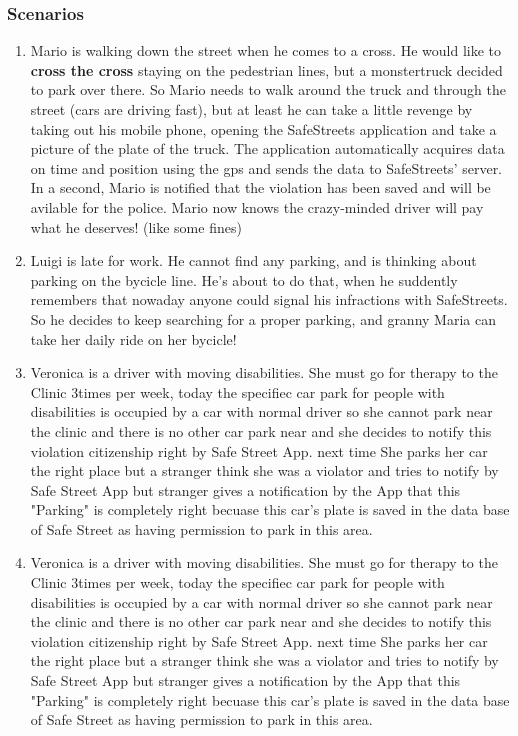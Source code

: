 \documentclass{article}
\newcommand{\enum}[1]{\texttt{#1.\arabic*}}
\begin{document}
		\subsubsection{Scenarios}
		
			\begin{enumerate}[label=\enum{S}]
				\item \label{S:The man, the street and the monstertruck}
				Mario is walking down the street when he comes to a cross. He would like to \textbf{cross the cross} staying on the pedestrian lines, but a monstertruck decided to park over there. So Mario needs to walk around the truck and through the street (cars are driving fast), but at least he can take a little revenge by taking out his mobile phone, opening the SafeStreets application and take a picture of the plate of the truck. The application automatically acquires data on time and position using the gps and sends the data to SafeStreets' server. In a second, Mario is notified that the violation has been saved and will be avilable for the police.
Mario now knows the crazy-minded driver will pay what he deserves! (like some fines)
		\item \label{S:Prevent is better than healing}Luigi is late for work. He cannot find any parking, and is thinking about parking on the bycicle line. He's about to do that, when he suddently remembers that nowaday anyone could signal his infractions with SafeStreets. So he decides to keep searching for a proper parking, and granny Maria can take her daily ride on her bycicle!
		\item\label{S:disabilities}Veronica is a driver with moving disabilities. She must go for therapy to the Clinic 3times per week, today the specifiec car park for people with disabilities is occupied by a car with normal driver so she cannot park near the clinic and there is no other car park near and she decides to notify this violation citizenship right by Safe Street App. next time She parks her car the right place but a stranger think she was a violator and tries to notify by Safe Street App but stranger gives a notification by the App that this "Parking" is completely right becuase this car's plate is saved in the data base of Safe Street as having permission to park in this area.

			
		\item\label{S:disabilities}Veronica is a driver with moving disabilities. She must go for therapy to the Clinic 3times per week, today the specifiec car park for people with disabilities is occupied by a car with normal driver so she cannot park near the clinic and there is no other car park near and she decides to notify this violation citizenship right by Safe Street App. next time She parks her car the right place but a stranger think she was a violator and tries to notify by Safe Street App but stranger gives a notification by the App that this "Parking" is completely right becuase this car's plate is saved in the data base of Safe Street as having permission to park in this area.


\end{enumerate}
\end{document}
